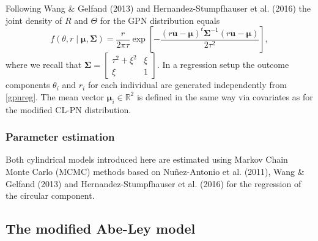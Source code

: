 \documentclass[12pt,]{article}
\begin{document}
Following Wang \& Gelfand (2013) and Hernandez-Stumpfhauser et al.
(2016) the joint density of \(R\) and \(\Theta\) for the GPN
distribution equals \begin{equation}\label{gpnreg}
f(\theta, r \mid \boldsymbol{\mu}, \boldsymbol{\Sigma}) = \frac{r}{2\pi\tau} \exp\left[ -\frac{(r\boldsymbol{u}-\boldsymbol{\mu})^{t}\boldsymbol{\Sigma}^{-1}(r\boldsymbol{u}-\boldsymbol{\mu})}{2\tau^2}\right],
\end{equation} \noindent where we recall that
\(\boldsymbol{\Sigma} = \begin{bmatrix} \tau^2 + \xi^2 & \xi\\ \xi & 1 \end{bmatrix}\).
In a regression setup the outcome components \(\theta_i\) and \(r_i\)
for each individual are generated independently from \eqref{gpnreg}. The
mean vector \(\boldsymbol{\mu}_i \in \mathbb{R}^2\) is defined in the
same way via covariates as for the modified CL-PN distribution.

\subsubsection{Parameter estimation}

Both cylindrical models introduced here are estimated using Markov Chain
Monte Carlo (MCMC) methods based on Nuñez-Antonio et al. (2011), Wang \&
Gelfand (2013) and Hernandez-Stumpfhauser et al. (2016) for the
regression of the circular component.

\subsection{The modified Abe-Ley model}\label{WeiSSVM}
\end{document}
